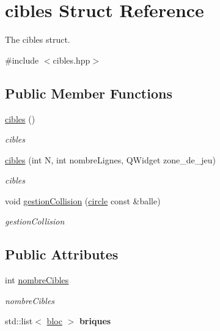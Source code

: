 \hypertarget{structcibles}{\section{cibles Struct Reference}
\label{structcibles}
}


The cibles struct.  




{\ttfamily \#include $<$cibles.\-hpp$>$}

\subsection*{Public Member Functions}
\begin{DoxyCompactItemize}
\item 
\hypertarget{structcibles_aff3b848ce81ad0ce76482844a6ad3ac1}{\hyperlink{structcibles_aff3b848ce81ad0ce76482844a6ad3ac1}{cibles} ()}\label{structcibles_aff3b848ce81ad0ce76482844a6ad3ac1}

\begin{DoxyCompactList}\small\item\em cibles \end{DoxyCompactList}\item 
\hyperlink{structcibles_a638f2d963ebfaf52e64608ed629311bc}{cibles} (int N, int nombre\-Lignes, Q\-Widget zone\-\_\-de\-\_\-jeu)
\begin{DoxyCompactList}\small\item\em cibles \end{DoxyCompactList}\item 
void \hyperlink{structcibles_a361b3e39738fcc849de170d392a65b6c}{gestion\-Collision} (\hyperlink{structcircle}{circle} const \&balle)
\begin{DoxyCompactList}\small\item\em gestion\-Collision \end{DoxyCompactList}\end{DoxyCompactItemize}
\subsection*{Public Attributes}
\begin{DoxyCompactItemize}
\item 
\hypertarget{structcibles_a5882b203001202b7cf98bb57f54638d5}{int \hyperlink{structcibles_a5882b203001202b7cf98bb57f54638d5}{nombre\-Cibles}}\label{structcibles_a5882b203001202b7cf98bb57f54638d5}

\begin{DoxyCompactList}\small\item\em nombre\-Cibles \end{DoxyCompactList}\item 
\hypertarget{structcibles_ac5061cda0bf0b1709c149b55f79f8eec}{std\-::list$<$ \hyperlink{structbloc}{bloc} $>$ {\bfseries briques}}\label{structcibles_ac5061cda0bf0b1709c149b55f79f8eec}

\end{DoxyCompactItemize}


